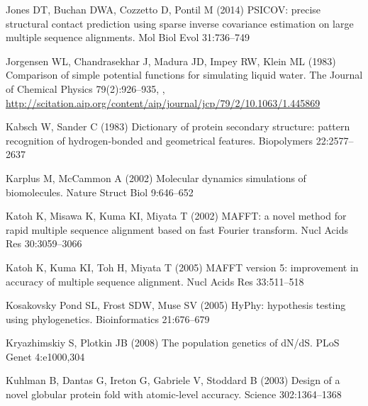 \documentclass[smallextended]{svjour3}
\begin{document}
\begin{thebibliography}{59}
Jones DT, Buchan DWA, Cozzetto D, Pontil M (2014) {PSICOV:} precise structural
  contact prediction using sparse inverse covariance estimation on large
  multiple sequence alignments. Mol Biol Evol 31:736--749

Jorgensen WL, Chandrasekhar J, Madura JD, Impey RW, Klein ML (1983) Comparison
  of simple potential functions for simulating liquid water. The Journal of
  Chemical Physics 79(2):926--935, ,
  \urlprefix\url{http://scitation.aip.org/content/aip/journal/jcp/79/2/10.1063/1.445869}

Kabsch W, Sander C (1983) Dictionary of protein secondary structure: pattern
  recognition of hydrogen-bonded and geometrical features. Biopolymers
  22:2577--2637

Karplus M, McCammon A (2002) Molecular dynamics simulations of biomolecules.
  Nature Struct Biol 9:646--652

Katoh K, Misawa K, Kuma KI, Miyata T (2002) {MAFFT:} a novel method for rapid
  multiple sequence alignment based on fast {Fourier} transform. Nucl Acids Res
  30:3059--3066

Katoh K, Kuma KI, Toh H, Miyata T (2005) {MAFFT} version 5: improvement in
  accuracy of multiple sequence alignment. Nucl Acids Res 33:511--518

{Kosakovsky Pond} SL, Frost SDW, Muse SV (2005) {HyPhy}: hypothesis testing
  using phylogenetics. Bioinformatics 21:676--679

Kryazhimskiy S, Plotkin JB (2008) The population genetics of {dN/dS}. PLoS
  Genet 4:e1000,304

Kuhlman B, Dantas G, Ireton G, Gabriele V, Stoddard B (2003) Design of a novel
  globular protein fold with atomic-level accuracy. Science 302:1364--1368


\end{thebibliography}
\end{document}
